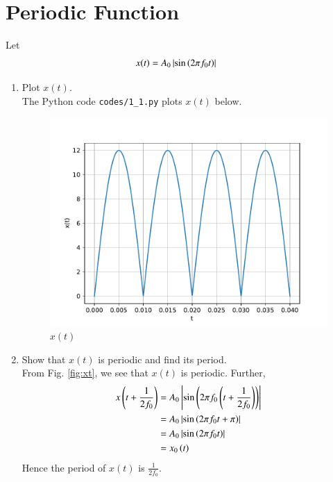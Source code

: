 \documentclass[journal,12pt,twocolumn]{IEEEtran}
\renewcommand\thesection{\arabic{section}}
\begin{document}
\section{Periodic Function}
Let
\begin{align}
x(t) &= A_0\left\vert\sin\left(2\pi f_0 t\right)\right\vert
\label{eq:10-orig-diff-def}
\end{align}
\begin{enumerate}[label=\thesection.\arabic*
,ref=\thesection.\theenumi]
\item Plot $x(t)$.
\\
\solution The Python code \texttt{codes/1\_1.py} plots $x(t)$ below.
\begin{figure}[!ht]
\includegraphics[width=\columnwidth]{figs/1.1.pdf}
\caption{$x(t)$}
\label{fig:xt}
\end{figure}
\item Show that $x(t)$ is periodic and find its period. \\
\solution From Fig. \eqref{fig:xt}, we see that $x(t)$ is periodic. Further,
\begin{align}
x\left(t+\frac{1}{2f_0}\right) &= A_0\left\vert\sin\left(2\pi f_0\left(t + \frac{1}{2f_0}\right)\right)\right\vert \\
&= A_0\left\vert\sin\left(2\pi f_0t + \pi\right)\right\vert \\
&= A_0\left\vert\sin\left(2\pi f_0t\right)\right\vert \\
&= x_0\left(t\right)
\end{align}
Hence the period of $x(t)$ is $\frac{1}{2f_0}$.
\end{enumerate}
\end{document}
